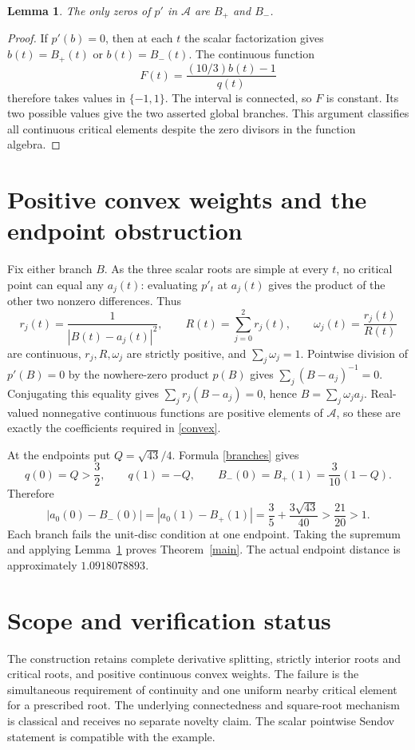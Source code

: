 \documentclass[11pt]{article}
\newtheorem{lemma}{Lemma}
\newcommand{\A}{\mathcal A}
\begin{document}
\begin{lemma}\label{allcritical}
The only zeros of $p'$ in $\A$ are $B_+$ and $B_-$.
\end{lemma}
\begin{proof}
If $p'(b)=0$, then at each $t$ the scalar factorization gives
$b(t)=B_+(t)$ or $b(t)=B_-(t)$. The continuous function
\[
 F(t)=\frac{(10/3)b(t)-1}{q(t)}
\]
therefore takes values in $\{-1,1\}$. The interval is connected, so $F$
is constant. Its two possible values give the two asserted global branches.
This argument classifies all continuous critical elements despite the zero
divisors in the function algebra.
\end{proof}

\section{Positive convex weights and the endpoint obstruction}
Fix either branch $B$. As the three scalar roots are simple at every $t$,
no critical point can equal any $a_j(t)$: evaluating $p'_t$ at $a_j(t)$
gives the product of the other two nonzero differences. Thus
\[
 r_j(t)=\frac1{|B(t)-a_j(t)|^2},\qquad
 R(t)=\sum_{j=0}^2r_j(t),\qquad
 \omega_j(t)=\frac{r_j(t)}{R(t)}
\]
are continuous, $r_j,R,\omega_j$ are strictly positive, and $\sum_j\omega_j=1$.
Pointwise division of $p'(B)=0$ by the nowhere-zero product $p(B)$ gives
$\sum_j(B-a_j)^{-1}=0$. Conjugating this equality gives
$\sum_j r_j(B-a_j)=0$, hence $B=\sum_j\omega_j a_j$.
Real-valued nonnegative continuous functions are positive elements of $\A$,
so these are exactly the coefficients required in \eqref{convex}.

At the endpoints put $Q=\sqrt{43}/4$. Formula \eqref{branches} gives
\[
 q(0)=Q>\frac32,\qquad q(1)=-Q,\qquad
 B_-(0)=B_+(1)=\frac3{10}(1-Q).
\]
Therefore
\begin{equation}\label{gap}
 |a_0(0)-B_-(0)|=|a_0(1)-B_+(1)|
 =\frac35+\frac{3\sqrt{43}}{40}>\frac{21}{20}>1.
\end{equation}
Each branch fails the unit-disc condition at one endpoint. Taking the
supremum and applying Lemma~\ref{allcritical} proves Theorem~\ref{main}.
The actual endpoint distance is approximately $1.0918078893$.

\section{Scope and verification status}
The construction retains complete derivative splitting, strictly interior
roots and critical roots, and positive continuous convex weights. The
failure is the simultaneous requirement of continuity and one uniform
nearby critical element for a prescribed root. The underlying connectedness
and square-root mechanism is classical and receives no separate novelty
claim. The scalar pointwise Sendov statement is compatible with the example.
\end{document}
